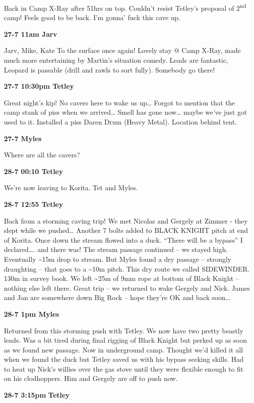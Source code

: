 Back in Camp X-Ray after 51hrs on top. Couldn't resist Tetley's proposal
of 2\textsuperscript{nd} camp! Feels good to be back. I'm gonna' fuck
this cave up.

\textbf{27-7 11am Jarv}

Jarv, Mike, Kate To the surface once again! Lovely stay @ Camp X-Ray,
made much more entertaining by Martin's situation comedy. Leads are
fantastic, Leopard is passable (drill and rawls to sort fully). Somebody
go there!

\textbf{27-7 10:30pm Tetley}

Great night's kip! No cavers here to wake us up\ldots{} Forgot to
mention that the camp stank of piss when we arrived\ldots{} Smell has
gone now\ldots{} maybe we've just got used to it. Installed a piss Daren
Drum (Heavy Metal). Location behind tent.

\textbf{27-7 Myles}

Where are all the cavers?

\textbf{28-7 00:10 Tetley}

We're now leaving to Korita. Tet and Myles.

\textbf{28-7 12:55 Tetley}

Back from a storming caving trip! We met Nicolas and Gergely at Zimmer -
they slept while we pushed\ldots{} Another 7 bolts added to BLACK KNIGHT
pitch at end of Korita. Once down the stream flowed into a duck. ``There
will be a bypass'' I declared\ldots{}. and there was! The stream passage
continued -- we stayed high. Eventually \textasciitilde{}15m drop to
stream. But Myles found a dry passage -- strongly draughting -- that
goes to a \textasciitilde{}10m pitch. This dry route we called
SIDEWINDER. 130m in survey book. We left \textasciitilde{}25m of 9mm
rope at bottom of Black Knight -- nothing else left there. Great trip --
we returned to wake Gergely and Nick. James and Jan are somewhere down
Big Rock -- hope they're OK and back soon\ldots{}

\textbf{28-7 1pm Myles}

Returned from this storming push with Tetley. We now have two pretty
beastly leads. Was a bit tired during final rigging of Black Knight but
perked up as soon as we found new passage. Now in underground camp.
Thought we'd killed it all when we found the duck but Tetley saved us
with his bypass seeking skills. Had to heat up Nick's willies over the
gas stove until they were flexible enough to fit on his clodhoppers. Him
and Gergely are off to push now.

\textbf{28-7 3:15pm} \textbf{Tetley}


